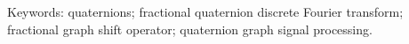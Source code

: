 
%

\lipsum[2]
\vspace{1em}

Keywords: quaternions; fractional quaternion discrete Fourier transform; fractional graph shift operator; quaternion graph signal processing.
